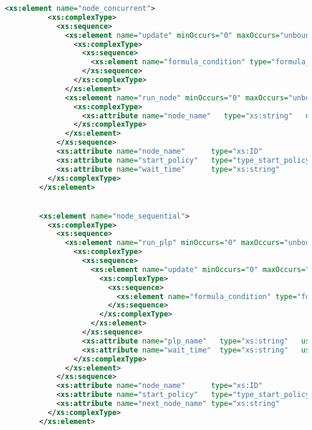 \begin{lstlisting}[style=stylexml,language=XML]
        <xs:element name="node_concurrent">
          <xs:complexType>
            <xs:sequence>
              <xs:element name="update" minOccurs="0" maxOccurs="unbounded">
                <xs:complexType>
                  <xs:sequence>
                    <xs:element name="formula_condition" type="formula_condition_type" minOccurs="1" maxOccurs="1" />
                  </xs:sequence>
                </xs:complexType>
              </xs:element>
              <xs:element name="run_node" minOccurs="0" maxOccurs="unbounded">
                <xs:complexType>
                  <xs:attribute name="node_name"   type="xs:string"   use="required"/>
                </xs:complexType>
              </xs:element>
            </xs:sequence>
            <xs:attribute name="node_name"      type="xs:ID"                use="required"/>
            <xs:attribute name="start_policy"   type="type_start_policy"    use="required"/>
            <xs:attribute name="wait_time"      type="xs:string"            use="optional"/>
          </xs:complexType>
        </xs:element>


        <xs:element name="node_sequential">
          <xs:complexType>
            <xs:sequence>
              <xs:element name="run_plp" minOccurs="0" maxOccurs="unbounded">
                <xs:complexType>
                  <xs:sequence>
                    <xs:element name="update" minOccurs="0" maxOccurs="unbounded">
                      <xs:complexType>
                        <xs:sequence>
                          <xs:element name="formula_condition" type="formula_condition_type" minOccurs="1" maxOccurs="1" />
                        </xs:sequence>
                      </xs:complexType>
                    </xs:element>
                  </xs:sequence>
                  <xs:attribute name="plp_name"   type="xs:string"   use="required"/>
                  <xs:attribute name="wait_time"  type="xs:string"   use="optional"/>
                </xs:complexType>
              </xs:element>
            </xs:sequence>
            <xs:attribute name="node_name"      type="xs:ID"                use="required"/>
            <xs:attribute name="start_policy"   type="type_start_policy"    use="required"/>
            <xs:attribute name="next_node_name" type="xs:string"            use="optional"/>
          </xs:complexType>
        </xs:element>



\end{lstlisting}
